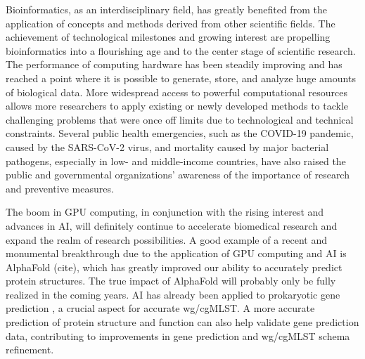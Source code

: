 Bioinformatics, as an interdisciplinary field, has greatly benefited from the application of concepts and methods derived from other scientific fields. The achievement of technological milestones and growing interest are propelling bioinformatics into a flourishing age and to the center stage of scientific research. The performance of computing hardware has been steadily improving and has reached a point where it is possible to generate, store, and analyze huge amounts of biological data. More widespread access to powerful computational resources allows more researchers to apply existing or newly developed methods to tackle challenging problems that were once off limits due to technological and technical constraints. Several public health emergencies, such as the COVID-19 pandemic, caused by the SARS-CoV-2 virus, and mortality caused by major bacterial pathogens, especially in low- and middle-income countries, have also raised the public and governmental organizations' awareness of the importance of research and preventive measures.

The boom in GPU computing, in conjunction with the rising interest and advances in AI, will definitely continue to accelerate biomedical research and expand the realm of research possibilities. A good example of a recent and monumental breakthrough due to the application of GPU computing and AI is AlphaFold (cite), which has greatly improved our ability to accurately predict protein structures. The true impact of AlphaFold will probably only be fully realized in the coming years. AI has already been applied to prokaryotic gene prediction \cite{sommer_balrog_2021}, a crucial aspect for accurate wg/cgMLST. A more accurate prediction of protein structure and function can also help validate gene prediction data, contributing to improvements in gene prediction and wg/cgMLST schema refinement.

